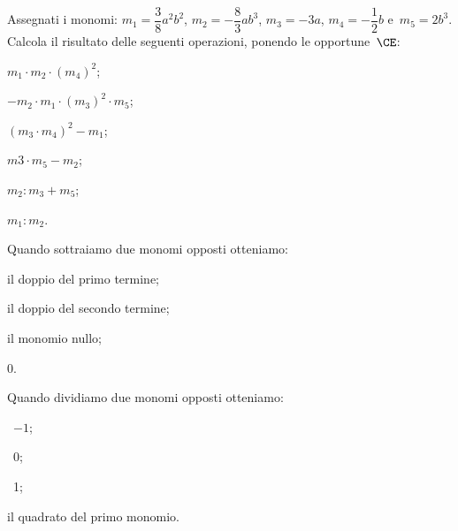 \begin{esercizio}[\Ast]
 \label{ese:10.38} %
Assegnati i monomi:
$m_{{1}}=\dfrac{3}{8}a^{2}b^{2}$, $m_{2}=-{\dfrac{8}{3}}ab^{3}$, $m_{3}=-3a$, $m_{{4}}=-{\dfrac{1}{2}}b$ e~$m_{{5}}=2b^{3}$.
Calcola il risultato delle seguenti operazioni, ponendo le opportune~$\CE$:
\begin{multicols}{3}
\begin{enumeratea}
 \item $m_{{1}}\cdot m_{2}\cdot (m_{{4}})^{2}$;
 \item $-m_{2}\cdot m_{{1}}\cdot (m_{3})^{2}\cdot m_{{5}}$;
 \item $(m_{3}\cdot m_{{4}})^{2}-m_{{1}}$;
 \item $m3\cdot m_{{5}}-m_{2}$;
 \item $m_{2}:m_{3}+m_{{5}}$;
 \item $m_{{1}}:m_{2}$.
\end{enumeratea}
\end{multicols}
\end{esercizio}

\begin{esercizio}[\Ast]
 \label{ese:10.39} %
Quando sottraiamo due monomi opposti otteniamo:
\begin{multicols}{2}
\begin{enumeratea}
\item il doppio del primo termine;
\item il doppio del secondo termine;
\item il monomio nullo;
\item 0.
\end{enumeratea}
\end{multicols}
\end{esercizio}
\pagebreak
\begin{esercizio}
 \label{ese:10.40} %
Quando dividiamo due monomi opposti otteniamo:
\begin{enumeratea}
\begin{multicols}{2}
\item~$-1$;
\item~0;
\item~1;
\item il quadrato del primo monomio.
\end{multicols}
\end{enumeratea}
\end{esercizio}

